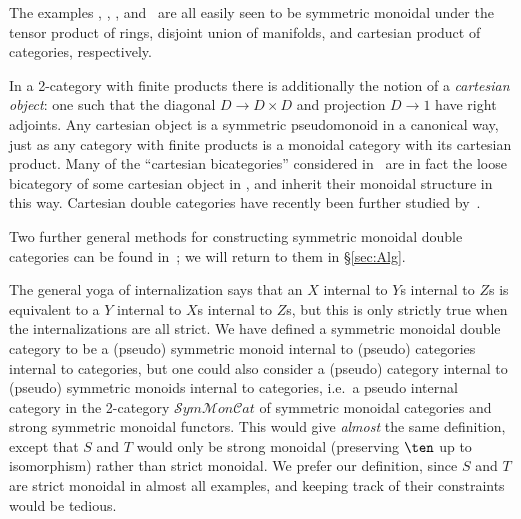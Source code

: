 \begin{eg}
  The examples \lnCob, \lMod, \lProf, and \lSpan\ are all easily seen to be
  symmetric monoidal under the tensor product of rings, disjoint union
  of manifolds, and cartesian product of categories, respectively.
\end{eg}

\begin{rmk}
  In a 2-category with finite products there is additionally the
  notion of a \emph{cartesian object}: one such that the diagonal
  $D\to D\times D$ and projection $D\to 1$ have right adjoints.  Any
  cartesian object is a symmetric pseudomonoid in a canonical way,
  just as any category with finite products is a monoidal category
  with its cartesian product.  Many of the ``cartesian bicategories''
  considered in~\cite{cw:cart-bicats-i,ckww:cartbicats-ii} are in
  fact the loose bicategory of some cartesian object in \cDbl,
  and inherit their monoidal structure in this way.
  Cartesian double categories have recently been further studied by~\cite{aleiferi2018cartesian}.
\end{rmk}

Two further general methods for constructing symmetric monoidal double
categories can be found in~\cite{shulman:frbi}; we will return to them in \S\ref{sec:Alg}.

\begin{rmk}
  The general yoga of internalization says that an $X$ internal to
  $Y$s internal to $Z$s is equivalent to a $Y$ internal to $X$s
  internal to $Z$s, but this is only strictly true when the
  internalizations are all strict.  We have defined a symmetric
  monoidal double category to be a (pseudo) symmetric monoid internal
  to (pseudo) categories internal to categories, but one could also
  consider a (pseudo) category internal to (pseudo) symmetric monoids
  internal to categories, i.e.\ a pseudo internal category in the
  2-category
  $\mathcal{S}\mathit{ym}\mathcal{M}\mathit{on}\mathcal{C}\mathit{at}$
  of symmetric monoidal categories and strong symmetric monoidal
  functors.  This would give \emph{almost} the same definition, except
  that $S$ and $T$ would only be strong monoidal (preserving $\ten$ up
  to isomorphism) rather than strict monoidal.  We prefer our
  definition, since $S$ and $T$ are strict monoidal in almost all
  examples, and keeping track of their constraints would be tedious.
\end{rmk}

